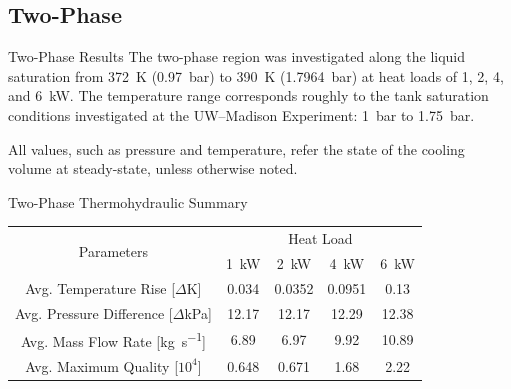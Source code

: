 \documentclass[10pt,t,xcolor=table,compress]{UWMadBeamer}
\begin{document}
    \subsection*{Two-Phase}
    \begin{frame}{Two-Phase Results}
        The two-phase region was investigated along the liquid saturation from \SI{372}{\kelvin} (\SI{0.97}{\bar}) to \SI{390}{\kelvin} (\SI{1.7964}{\bar}) at heat loads of \num{1}, \num{2}, \num{4}, and \SI{6}{\kW}.
        The temperature range corresponds roughly to the tank saturation conditions investigated at the UW--Madison Experiment: \SI{1}{\bar} to \SI{1.75}{\bar}.
        
        All values, such as pressure and temperature, refer the state of the cooling volume at steady-state, unless otherwise noted.
    \end{frame}
    \begin{frame}{Two-Phase Thermohydraulic Summary}
        \begin{table}%
            \centering
            \begin{tabular}{ccccc}
                \toprule
                    \multirow{2}{*}{Parameters}                     & \multicolumn{4}{c}{Heat Load} \\[0.1em]\cline{2-5}
                                                                    &    \SI{1}{\kW} & \SI{2}{\kW}   & \SI{4}{\kW}   & \SI{6}{\kW} \\\midrule
                Avg. Temperature Rise    [$\Delta$\si{\kelvin}]       & \num{0.034}    & \num{0.0352}  & \num{0.0951}  & \num{0.13}  \\[0.5em]
                Avg. Pressure Difference [$\Delta$\si{\kilo\pascal}]  & \num{12.17}    & \num{12.17}   & \num{12.29}   & \num{12.38} \\[0.5em]
                Avg. Mass Flow Rate      [\si{\kg\per\second}]      & \num{6.89}     & \num{6.97}    & \num{9.92}    & \num{10.89} \\[0.5em]
                Avg. Maximum Quality      [$10^4$]                  & \num{0.648}    & \num{0.671}   & \num{1.68}    & \num{2.22} \\[0.5em]
                \bottomrule
            \end{tabular}
        \end{table}
    \end{frame}
\end{document}
